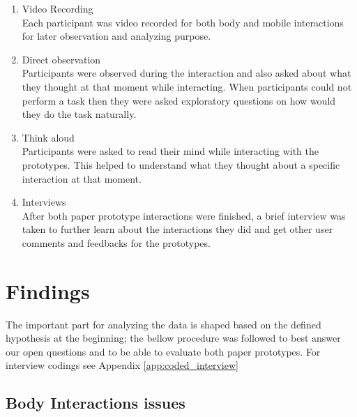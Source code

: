 \begin{enumerate}
\item Video Recording \\
Each participant was video recorded for both body and mobile interactions for later observation and analyzing purpose. 

\item Direct observation \\
Participants were observed during the interaction and also asked about what they thought at that moment while interacting. When participants could not perform a task then they were asked exploratory questions on how would they do the task naturally.

\item Think aloud \\
Participants were asked to read their mind while interacting with the prototypes. This helped to understand what they thought about a specific interaction at that moment. 

\item Interviews \\
After both paper prototype interactions were finished, a brief interview was taken to further learn about the interactions they did and get other user comments and feedbacks for the prototypes.
\end{enumerate}



\section{Findings}
The important part for analyzing the data is shaped based on the defined hypothesis at the beginning; the bellow procedure was followed to best answer our open questions and to be able to evaluate both paper prototypes. For interview codings 
see Appendix \ref{app:coded_interview}

\subsection{Body Interactions issues}

